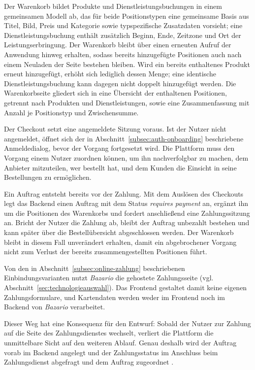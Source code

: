 Der Warenkorb bildet Produkte und Dienstleistungsbuchungen in einem
gemeinsamen Modell ab, das für beide Positionstypen eine gemeinsame
Basis aus Titel, Bild, Preis und Kategorie sowie typspezifische
Zusatzdaten vorsieht; eine Dienstleistungsbuchung enthält zusätzlich
Beginn, Ende, Zeitzone und Ort der Leistungserbringung. Der Warenkorb
bleibt über einen erneuten Aufruf der Anwendung hinweg erhalten,
sodass bereits hinzugefügte Positionen auch nach einem Neuladen der
Seite bestehen bleiben. Wird ein bereits enthaltenes Produkt erneut
hinzugefügt, erhöht sich lediglich dessen Menge; eine identische
Dienstleistungsbuchung kann dagegen nicht doppelt hinzugefügt werden.
Die Warenkorbseite gliedert sich in eine Übersicht der enthaltenen
Positionen, getrennt nach Produkten und Dienstleistungen, sowie eine
Zusammenfassung mit Anzahl je Positionstyp und Zwischensumme.

Der Checkout setzt eine angemeldete Sitzung voraus. Ist der Nutzer
nicht angemeldet, öffnet sich der in
Abschnitt~\ref{subsec:auth-onboarding} beschriebene Anmeldedialog,
bevor der Vorgang fortgesetzt wird. Die Plattform muss den Vorgang
einem Nutzer zuordnen können, um ihn nachverfolgbar zu machen, dem
Anbieter mitzuteilen, wer bestellt hat, und dem Kunden die Einsicht
in seine Bestellungen zu ermöglichen.

Ein Auftrag entsteht bereits vor der Zahlung. Mit dem Auslösen des
Checkouts legt das Backend einen Auftrag mit dem Status
\textit{requires payment} an, ergänzt ihn um die Positionen des
Warenkorbs und fordert anschließend eine Zahlungssitzung an. Bricht
der Nutzer die Zahlung ab, bleibt der Auftrag unbezahlt bestehen und
kann später über die Bestellübersicht abgeschlossen werden. Der
Warenkorb bleibt in diesem Fall unverändert erhalten, damit ein
abgebrochener Vorgang nicht zum Verlust der bereits
zusammengestellten Positionen führt.

Von den in Abschnitt~\ref{subsec:online-zahlung} beschriebenen
Einbindungsvarianten nutzt \textit{Bazario} die gehostete
Zahlungsseite (vgl. Abschnitt~\ref{sec:technologieauswahl}). Das
Frontend gestaltet damit keine eigenen Zahlungsformulare, und
Kartendaten werden weder im Frontend noch im Backend von
\textit{Bazario} verarbeitet.

Dieser Weg hat eine Konsequenz für den Entwurf: Sobald der Nutzer zur
Zahlung auf die Seite des Zahlungsdienstes wechselt, verliert die
Plattform die unmittelbare Sicht auf den weiteren Ablauf. Genau
deshalb wird der Auftrag vorab im Backend angelegt und der
Zahlungsstatus im Anschluss beim Zahlungsdienst abgefragt und dem
Auftrag zugeordnet \cite{stripe_checkout_docs}.


